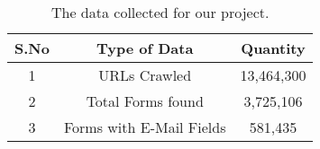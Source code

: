 \begin{table}[!htbp]
	\centering
	\begin{tabular}{|c|c|c|}
		\hline
		\multicolumn{1}{|c|}{\textbf{S.No}} &
		\multicolumn{1}{c|}{\textbf{Type of Data}} &
		\multicolumn{1}{c|}{\textbf{Quantity}}\\
		\hline
		1 & URLs Crawled & 13,464,300\\
		\hline
		2 & Total Forms found & 3,725,106\\
		\hline
		3 & Forms with E-Mail Fields & 581,435\\
		\hline
	\end{tabular}
	\caption[Collected data]{The data collected for our project.}
	\label{tab:data}
\end{table}